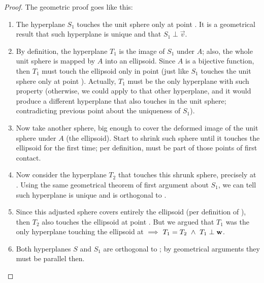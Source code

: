 \begin{proof}
The geometric proof goes like this: \\

\begin{enumerate}
\item The hyperplane $S_1$ touches the unit sphere only at point
  . It is a geometrical result that such hyperplane is unique
  and that $S_1 \perp \vec{v}$. \\

\item By definition, the hyperplane $T_1$ is the image of $S_1$ under
  $A$; also, the whole unit sphere is mapped by $A$ into an ellipsoid. Since
  $A$ is a bijective function, then $T_1$ must touch the ellipsoid only in
  point  (just like $S_1$ touches the unit sphere only at point
  ). Actually, $T_1$ must be the only hyperplane with such
  property (otherwise, we could apply  to that other hyperplane,
  and it would produce a different hyperplane that also touches
   in the unit sphere; contradicting previous point about the
  uniqueness of $S_1$). \\

\item Now take another sphere, big enough to cover the deformed image of
  the unit sphere under $A$ (the ellipsoid). Start to shrink
  such sphere until it touches the ellipsoid for the first time; per
  definition,  must be part of those points of first
  contact. \\

\item Now consider the hyperplane $T_2$ that touches this shrunk sphere,
  precisely at . Using the same geometrical theorem of first
  argument about $S_1$, we can tell such hyperplane is unique and is
  orthogonal to . \\

\item Since this adjusted sphere covers entirely the ellipsoid (per
  definition of ), then $T_2$ also touches the ellipsoid at
  point . But we argued that $T_1$ was the only hyperplane
  touching the ellipsoid at  $\implies$ $T_1 = T_2 \,\,\land\,\, T_1
  \perp \mathbf{w}$. \\

\item Both hyperplanes $S$ and $S_1$ are orthogonal to ; by
  geometrical arguments they must be parallel then. \\


\end{enumerate}
\end{proof}
